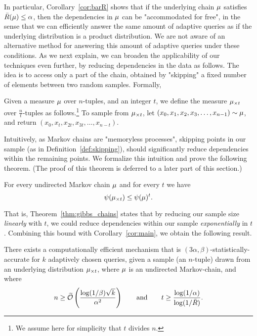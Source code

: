 \documentclass[12pt,a4paper,oneside,onecolumn]{book}
\begin{document}
In particular, Corollary~\ref{cor:barR} shows that if the underlying chain $\mu$ satisfies $\bar{R}(\mu)\leq\alpha$, then the dependencies in $\mu$ can be "accommodated for free", in the sense that we can efficiently answer the same amount of adaptive queries as if the underlying distribution is a product distribution. We are not aware of an alternative method for answering this amount of adaptive queries under these conditions. As we next explain, we can broaden the  applicability of our techniques even further, by reducing  dependencies in the data as follows. The idea is to access only a part of the chain, obtained by "skipping" a fixed number of elements between two random samples. Formally,

\begin{definition}\label{def:skipping}
Given a measure $\mu$ over $n$-tuples, and an integer $t$, we define the measure $\mu_{\times t}$ over $\frac{n}{t}$-tuples as follows.\footnote{We assume here for simplicity that $t$ divides $n$.} To sample from $\mu_{\times t}$, let $(x_0,x_1,x_2,x_3,\dots,x_{n-1})\sim\mu$, and return $(x_0,x_{t},x_{2t},x_{3t},\dots,x_{n-t})$.
\end{definition}


Intuitively, as Markov chains are "memoryless processes", skipping points in our sample (as in Definition~\ref{def:skipping}), should significantly reduce dependencies within the remaining points. We formalize this intuition and prove the following theorem. (The proof of this theorem is deferred to a later part of this section.)

\begin{theorem}
  \label{thm:gibbs_chains}
  For every undirected Markov chain $\mu$ and for every $t$ we have
  \[\psi(\mu_{\times t}) \leq \psi(\mu)^t.\]
\end{theorem}

That is, Theorem~\ref{thm:gibbs_chains} states that by reducing our sample size {\em linearly} with $t$, we could reduce dependencies within our sample {\em exponentially} in $t$. Combining this bound with Corollary~\ref{cor:main}, we obtain the following result.



\begin{corollary}
There exists a computationally efficient mechanism that is $(3\alpha,\beta)$-statistically-accurate for $k$ adaptively chosen queries, given a sample (an $n$-tuple) drawn from an underlying distribution $\mu_{\times t}$, where $\mu$ is an undirected Markov-chain, and where
$$
n\geq \widetilde{\mathcal{O}}\left(\frac{\log(1/\beta)\sqrt{k}}{\alpha^2}\right)\qquad\text{and}\qquad
t\geq \frac{\log (1/\alpha)}{\log (1/\bar{R})}.
$$
\end{corollary}
\end{document}
